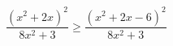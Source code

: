 \begin{ex}[type=inequality]
	\begin{condition}
		\( \dfrac{(x^2+2x)^2}{8x^2+3}\ge\dfrac{(x^2+2x-6)^2}{8x^2+3} \)
	\end{condition}
	\answer{\( (-\infty;-3]\cup[1;+\infty) \)}
\end{ex}